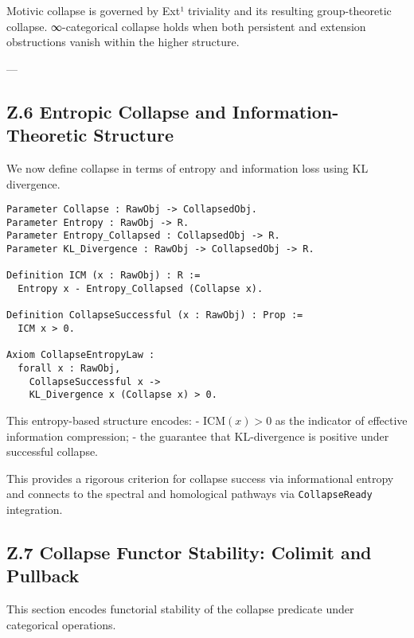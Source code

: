 \documentclass[11pt]{article}
\begin{document}
Motivic collapse is governed by Ext¹ triviality and its resulting group-theoretic collapse.  
∞-categorical collapse holds when both persistent and extension obstructions vanish within the higher structure.

---

\subsection*{Z.6 Entropic Collapse and Information-Theoretic Structure}

We now define collapse in terms of entropy and information loss using KL divergence.

\begin{lstlisting}[language=Coq]
Parameter Collapse : RawObj -> CollapsedObj.
Parameter Entropy : RawObj -> R.
Parameter Entropy_Collapsed : CollapsedObj -> R.
Parameter KL_Divergence : RawObj -> CollapsedObj -> R.

Definition ICM (x : RawObj) : R :=
  Entropy x - Entropy_Collapsed (Collapse x).

Definition CollapseSuccessful (x : RawObj) : Prop :=
  ICM x > 0.

Axiom CollapseEntropyLaw :
  forall x : RawObj,
    CollapseSuccessful x ->
    KL_Divergence x (Collapse x) > 0.
\end{lstlisting}

This entropy-based structure encodes:
- \( \mathrm{ICM}(x) > 0 \) as the indicator of effective information compression;
- the guarantee that KL-divergence is positive under successful collapse.

This provides a rigorous criterion for collapse success via informational entropy and connects to the spectral and homological pathways via \texttt{CollapseReady} integration.



\subsection*{Z.7 Collapse Functor Stability: Colimit and Pullback}

This section encodes functorial stability of the collapse predicate under categorical operations.
\end{document}
